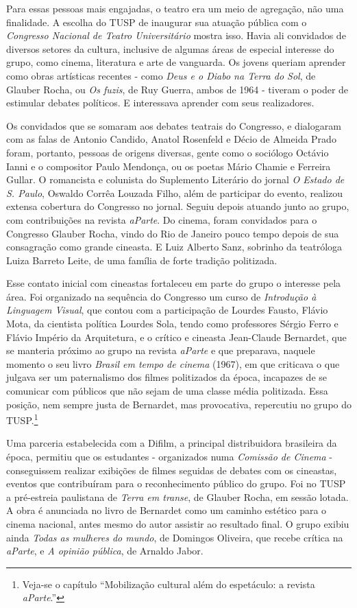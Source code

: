 Para essas pessoas mais engajadas, o teatro era um meio de agregação,
não uma finalidade. A escolha do TUSP de inaugurar sua atuação pública
com o \textit{Congresso Nacional de Teatro Universitário} mostra isso.
Havia ali convidados de diversos setores da cultura, inclusive de
algumas áreas de especial interesse do grupo, como cinema, literatura e
arte de vanguarda. Os jovens queriam aprender como obras artísticas
recentes - como \textit{Deus e o Diabo na Terra do Sol}, de Glauber Rocha,
ou \textit{Os fuzis}, de Ruy Guerra, ambos de 1964 - tiveram o poder de
estimular debates políticos. E interessava aprender com seus
realizadores.

Os convidados que se somaram aos debates teatrais do Congresso, e
dialogaram com as falas de Antonio Candido, Anatol Rosenfeld e Décio de
Almeida Prado foram, portanto, pessoas de origens diversas, gente como o
sociólogo Octávio Ianni e o compositor Paulo Mendonça, ou os poetas
Mário Chamie e Ferreira Gullar. O romancista e colunista do Suplemento
Literário do jornal \textit{O Estado de S. Paulo}, Oswaldo Corrêa Louzada
Filho, além de participar do evento, realizou extensa cobertura do
Congresso no jornal. Seguiu depois atuando junto ao grupo, com
contribuições na revista \textit{aParte}. Do cinema, foram convidados para
o Congresso Glauber Rocha, vindo do Rio de Janeiro pouco tempo depois de
sua consagração como grande cineasta. E Luiz Alberto Sanz, sobrinho da
teatróloga Luiza Barreto Leite, de uma família de forte tradição
politizada.

Esse contato inicial com cineastas fortaleceu em parte do grupo o
interesse pela área. Foi organizado na sequência do Congresso um curso
de \textit{Introdução à Linguagem Visual}, que contou com a participação de
Lourdes Fausto, Flávio Mota, da cientista política Lourdes Sola, tendo
como professores Sérgio Ferro e Flávio Império da Arquitetura, e o
crítico e cineasta Jean-Claude Bernardet, que se manteria próximo ao
grupo na revista \textit{aParte} e que preparava, naquele momento o seu
livro \textit{Brasil em tempo de cinema} (1967), em que criticava o que
julgava ser um paternalismo dos filmes politizados da época, incapazes
de se comunicar com públicos que não sejam de uma classe média
politizada. Essa posição, nem sempre justa de Bernardet, mas
provocativa, repercutiu no grupo do TUSP.\footnote{Veja-se o capítulo
  “Mobilização cultural além do espetáculo: a revista \textit{aParte}.”}

Uma parceria estabelecida com a Difilm, a principal distribuidora
brasileira da época, permitiu que os estudantes - organizados numa
\textit{Comissão de Cinema} - conseguissem realizar exibições de filmes
seguidas de debates com os cineastas, eventos que contribuíram para o
reconhecimento público do grupo. Foi no TUSP a pré-estreia paulistana de
\textit{Terra em transe}, de Glauber Rocha, em sessão lotada. A obra é
anunciada no livro de Bernardet como um caminho estético para o cinema
nacional, antes mesmo do autor assistir ao resultado final. O grupo
exibiu ainda \textit{Todas as mulheres do mundo}, de Domingos Oliveira, que
recebe crítica na \textit{aParte}, e \textit{A opinião pública}, de Arnaldo
Jabor.

